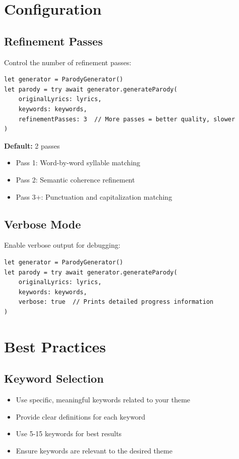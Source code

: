\documentclass[11pt,a4paper]{article}
\begin{document}
\section{Configuration}

\subsection{Refinement Passes}

Control the number of refinement passes:

\begin{lstlisting}
let generator = ParodyGenerator()
let parody = try await generator.generateParody(
    originalLyrics: lyrics,
    keywords: keywords,
    refinementPasses: 3  // More passes = better quality, slower
)
\end{lstlisting}

\textbf{Default:} 2 passes
\begin{itemize}
    \item Pass 1: Word-by-word syllable matching
    \item Pass 2: Semantic coherence refinement
    \item Pass 3+: Punctuation and capitalization matching
\end{itemize}

\subsection{Verbose Mode}

Enable verbose output for debugging:

\begin{lstlisting}
let generator = ParodyGenerator()
let parody = try await generator.generateParody(
    originalLyrics: lyrics,
    keywords: keywords,
    verbose: true  // Prints detailed progress information
)
\end{lstlisting}

\section{Best Practices}

\subsection{Keyword Selection}

\begin{itemize}
    \item Use specific, meaningful keywords related to your theme
    \item Provide clear definitions for each keyword
    \item Use 5-15 keywords for best results
    \item Ensure keywords are relevant to the desired theme
\end{itemize}
\end{document}
